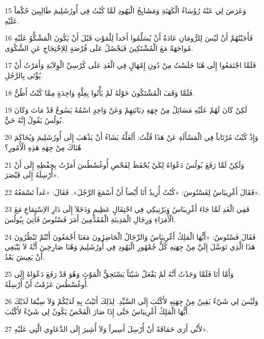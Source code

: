 \par 15 وَعَرَضَ لِي عَنْهُ رُؤَسَاءُ الْكَهَنَةِ وَمَشَايِخُ الْيَهُودِ لَمَّا كُنْتُ فِي أُورُشَلِيمَ طَالِبِينَ حُكْماً عَلَيْهِ.
\par 16 فَأَجَبْتُهُمْ أَنْ لَيْسَ لِلرُّومَانِ عَادَةٌ أَنْ يُسَلِّمُوا أَحَداً لِلْمَوْتِ قَبْلَ أَنْ يَكُونَ الْمَشْكُّوُ عَلَيْهِ مُواجَهَةً مَعَ الْمُشْتَكِينَ فَيَحْصُلُ عَلَى فُرْصَةٍ لِلاِحْتِجَاجِ عَنِ الشَّكْوَى.
\par 17 فَلَمَّا اجْتَمَعُوا إِلَى هُنَا جَلَسْتُ مِنْ دُونِ إِمْهَالٍ فِي الْغَدِ عَلَى كُرْسِيِّ الْوِلاَيَةِ وَأَمَرْتُ أَنْ يُؤْتَى بِالرَّجُلِ.
\par 18 فَلَمَّا وَقَفَ الْمُشْتَكُونَ حَوْلَهُ لَمْ يَأْتُوا بِعِلَّةٍ وَاحِدَةٍ مِمَّا كُنْتُ أَظُنُّ.
\par 19 لَكِنْ كَانَ لَهُمْ عَلَيْهِ مَسَائِلُ مِنْ جِهَةِ دِيَانَتِهِمْ وَعَنْ وَاحِدٍ اسْمُهُ يَسُوعُ قَدْ مَاتَ وَكَانَ بُولُسُ يَقُولُ إِنَّهُ حَيٌّ.
\par 20 وَإِذْ كُنْتُ مُرْتَاباً فِي الْمَسْأَلَةِ عَنْ هَذَا قُلْتُ: أَلَعَلَّهُ يَشَاءُ أَنْ يَذْهَبَ إِلَى أُورُشَلِيمَ وَيُحَاكَمَ هُنَاكَ مِنْ جِهَةِ هَذِهِ الْأُمُورِ؟
\par 21 وَلَكِنْ لَمَّا رَفَعَ بُولُسُ دَعْوَاهُ لِكَيْ يُحْفَظَ لِفَحْصِ أُوغُسْطُسَ أَمَرْتُ بِحِفْظِهِ إِلَى أَنْ أُرْسِلَهُ إِلَى قَيْصَرَ».
\par 22 فَقَالَ أَغْرِيبَاسُ لِفَسْتُوسَ: «كُنْتُ أُرِيدُ أَنَا أَيْضاً أَنْ أَسْمَعَ الرَّجُلَ». فَقَالَ: «غَداً تَسْمَعُهُ».
\par 23 فَفِي الْغَدِ لَمَّا جَاءَ أَغْرِيبَاسُ وَبَرْنِيكِي فِي احْتِفَالٍ عَظِيمٍ وَدَخَلاَ إِلَى دَارِ الاِسْتِمَاعِ مَعَ الْأُمَرَاءِ وَرِجَالِ الْمَدِينَةِ الْمُقَدَّمِينَ أَمَرَ فَسْتُوسُ فَأُتِيَ بِبُولُسَ.
\par 24 فَقَالَ فَسْتُوسُ: «أَيُّهَا الْمَلِكُ أَغْرِيبَاسُ وَالرِّجَالُ الْحَاضِرُونَ مَعَنَا أَجْمَعُونَ أَنْتُمْ تَنْظُرُونَ هَذَا الَّذِي تَوَسَّلَ إِلَيَّ مِنْ جِهَتِهِ كُلُّ جُمْهُورِ الْيَهُودِ فِي أُورُشَلِيمَ وَهُنَا صَارِخِينَ أَنَّهُ لاَ يَنْبَغِي أَنْ يَعِيشَ بَعْدُ.
\par 25 وَأَمَّا أَنَا فَلَمَّا وَجَدْتُ أَنَّهُ لَمْ يَفْعَلْ شَيْئاً يَسْتَحِقُّ الْمَوْتَ وَهُوَ قَدْ رَفَعَ دَعْوَاهُ إِلَى أُوغُسْطُسَ عَزَمْتُ أَنْ أُرْسِلَهُ.
\par 26 وَلَيْسَ لِي شَيْءٌ يَقِينٌ مِنْ جِهَتِهِ لأَكْتُبَ إِلَى السَّيِّدِ. لِذَلِكَ أَتَيْتُ بِهِ لَدَيْكُمْ وَلاَ سِيَّمَا لَدَيْكَ أَيُّهَا الْمَلِكُ أَغْرِيبَاسُ حَتَّى إِذَا صَارَ الْفَحْصُ يَكُونُ لِي شَيْءٌ لأَكْتُبَ.
\par 27 لأَنِّي أَرَى حَمَاقَةً أَنْ أُرْسِلَ أَسِيراً وَلاَ أُشِيرَ إِلَى الدَّعَاوِي الَّتِي عَلَيْهِ».

